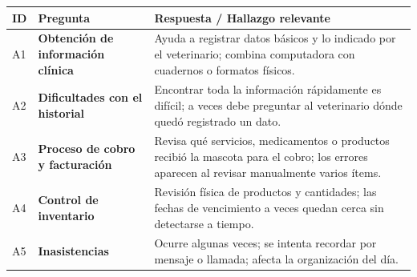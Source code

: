 \documentclass[
]{article}
\newcounter{none} %
\begin{document}
{\def\LTcaptype{none} %
\begin{longtable}[]{|
  >{\centering\arraybackslash}p{}|
  >{\raggedright\arraybackslash}p{}|
  >{\raggedright\arraybackslash}p{}|}
\hline
\begin{minipage}[b]{\linewidth}\centering
\textbf{ID}
\end{minipage} & \begin{minipage}[b]{\linewidth}\centering
\textbf{Pregunta}
\end{minipage} & \begin{minipage}[b]{\linewidth}\raggedright
\textbf{Respuesta / Hallazgo relevante}
\end{minipage} \\
\hline
\endhead
\hline
\endlastfoot
A1 & \textbf{Obtención de información clínica} &
\begin{minipage}[t]{\linewidth}\raggedright
Ayuda a registrar datos básicos y lo indicado por el veterinario; combina computadora con cuadernos o formatos físicos.
\end{minipage} \\
\hline
A2 & \textbf{Dificultades con el historial} &
\begin{minipage}[t]{\linewidth}\raggedright
Encontrar toda la información rápidamente es difícil; a veces debe preguntar al veterinario dónde quedó registrado un dato.
\end{minipage} \\
\hline
A3 & \textbf{Proceso de cobro y facturación} &
\begin{minipage}[t]{\linewidth}\raggedright
Revisa qué servicios, medicamentos o productos recibió la mascota para el cobro; los errores aparecen al revisar manualmente varios ítems.
\end{minipage} \\
\hline
A4 & \textbf{Control de inventario} &
\begin{minipage}[t]{\linewidth}\raggedright
Revisión física de productos y cantidades; las fechas de vencimiento a veces quedan cerca sin detectarse a tiempo.
\end{minipage} \\
\hline
A5 & \textbf{Inasistencias} &
\begin{minipage}[t]{\linewidth}\raggedright
Ocurre algunas veces; se intenta recordar por mensaje o llamada; afecta la organización del día.
\end{minipage} \\

\end{longtable}}
\end{document}
